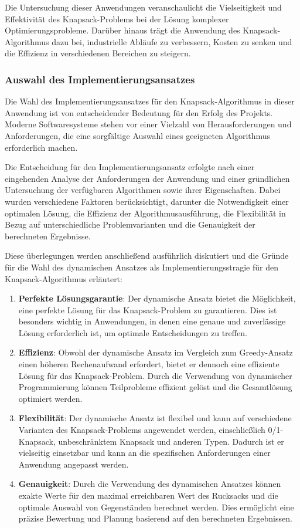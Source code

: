 Die Untersuchung dieser Anwendungen veranschaulicht die Vielseitigkeit und Effektivität des Knapsack-Problems bei der Lösung
komplexer Optimierungsprobleme. Darüber hinaus trägt die Anwendung des Knapsack-Algorithmus dazu bei, industrielle Abläufe
zu verbessern, Kosten zu senken und die Effizienz in verschiedenen Bereichen zu steigern.

\subsubsection{Auswahl des Implementierungsansatzes}
Die Wahl des Implementierungsansatzes für den Knapsack-Algorithmus in dieser Anwendung ist von entscheidender Bedeutung
für den Erfolg des Projekts. Moderne Softwaresysteme stehen vor einer Vielzahl von Herausforderungen und Anforderungen,
die eine sorgfältige Auswahl eines geeigneten Algorithmus erforderlich machen.

Die Entscheidung für den Implementierungsansatz erfolgte nach einer eingehenden Analyse der Anforderungen der Anwendung
und einer gründlichen Untersuchung der verfügbaren Algorithmen sowie ihrer Eigenschaften. Dabei wurden verschiedene
Faktoren berücksichtigt, darunter die Notwendigkeit einer optimalen Lösung, die Effizienz der Algorithmusausführung, die
Flexibilität in Bezug auf unterschiedliche Problemvarianten und die Genauigkeit der berechneten Ergebnisse.

Diese überlegungen werden anschließend ausführlich diskutiert und die Gründe für die Wahl des dynamischen Ansatzes als
Implementierungsstragie für den Knapsack-Algorithmus erläutert:
\begin{enumerate}
    \item \textbf{Perfekte Lösungsgarantie}: Der dynamische Ansatz bietet die Möglichkeit, eine perfekte Lösung für das
    Knapsack-Problem zu garantieren. Dies ist besonders wichtig in Anwendungen, in denen eine genaue und zuverlässige
    Lösung erforderlich ist, um optimale Entscheidungen zu treffen.
    \item \textbf{Effizienz}: Obwohl der dynamische Ansatz im Vergleich zum Greedy-Ansatz einen höheren Rechenaufwand
    erfordert, bietet er dennoch eine effiziente Lösung für das Knapsack-Problem. Durch die Verwendung von dynamischer
    Programmierung können Teilprobleme effizient gelöst und die Gesamtlösung optimiert werden.
    \item \textbf{Flexibilität}: Der dynamische Ansatz ist flexibel und kann auf verschiedene Varianten des Knapsack-Problems
    angewendet werden, einschließlich 0/1-Knapsack, unbeschränktem Knapsack und anderen Typen. Dadurch ist er vielseitig
    einsetzbar und kann an die spezifischen Anforderungen einer Anwendung angepasst werden.
    \item \textbf{Genauigkeit}: Durch die Verwendung des dynamischen Ansatzes können exakte Werte für den maximal erreichbaren
    Wert des Rucksacks und die optimale Auswahl von Gegenständen berechnet werden. Dies ermöglicht eine präzise Bewertung
    und Planung basierend auf den berechneten Ergebnissen.
\end{enumerate}

